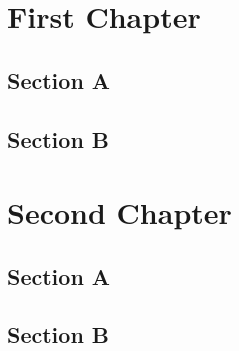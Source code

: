 \documentclass[12pt,a4paper]{book}
\begin{document}
\frontmatter
\dominitoc \tableofcontents
{}
\renewcommand{\cftsecfont}{\normalfont\small}
\mainmatter
\chapter{First Chapter} \minitoc
\section{Section A} \section{Section B}
\chapter{Second Chapter} \minitoc
\section{Section A} \section{Section B}
\end{document}
